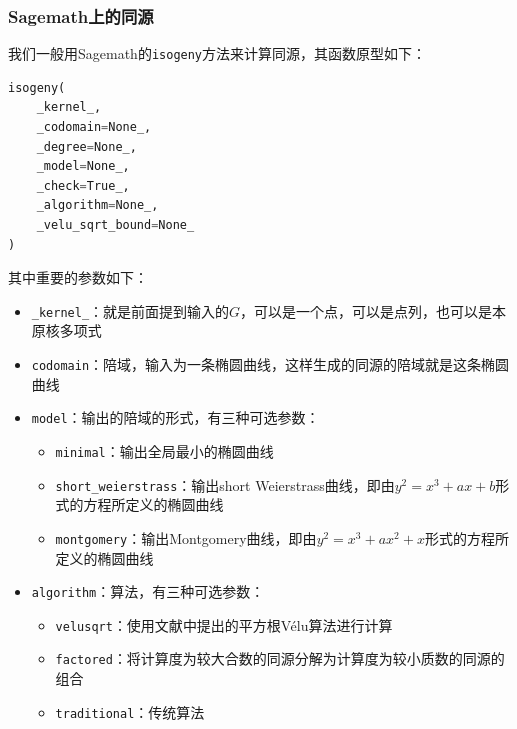 \documentclass{book}
\numberwithin{equation}{subsubsection}
\begin{document}
\subsubsection*{Sagemath上的同源}
我们一般用Sagemath的\texttt{isogeny}方法来计算同源，其函数原型如下：
\begin{lstlisting}[language=Python,basicstyle=\ttfamily,breaklines=true,keywordstyle=\bfseries\color{blue}]
isogeny(
    _kernel_, 
    _codomain=None_, 
    _degree=None_, 
    _model=None_, 
    _check=True_, 
    _algorithm=None_, 
    _velu_sqrt_bound=None_
)
\end{lstlisting}
其中重要的参数如下：
\begin{itemize}
    \item \texttt{\_kernel\_}：就是前面提到输入的$G$，可以是一个点，可以是点列，也可以是本原核多项式
    \item \texttt{codomain}：陪域，输入为一条椭圆曲线，这样生成的同源的陪域就是这条椭圆曲线
    \item \texttt{model}：输出的陪域的形式，有三种可选参数：
    \begin{itemize}
        \item \texttt{minimal}：输出全局最小的椭圆曲线
        \item \texttt{short\_weierstrass}：输出short Weierstrass曲线，即由$y^2=x^3+ax+b$形式的方程所定义的椭圆曲线
        \item \texttt{montgomery}：输出Montgomery曲线，即由$y^2=x^3+ax^2+x$形式的方程所定义的椭圆曲线
    \end{itemize}
    \item \texttt{algorithm}：算法，有三种可选参数：
    \begin{itemize}
        \item \texttt{velusqrt}：使用文献\cite{27}中提出的平方根Vélu算法进行计算
        \item \texttt{factored}：将计算度为较大合数的同源分解为计算度为较小质数的同源的组合
        \item \texttt{traditional}：传统算法
    \end{itemize}
\end{itemize}
\end{document}
